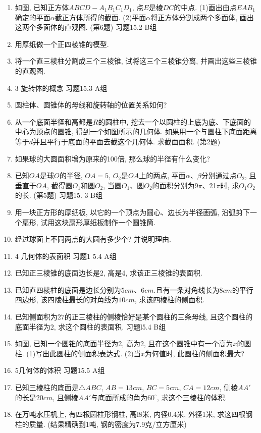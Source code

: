 \documentclass[10pt,a4paper]{article}
\begin{document}
\begin{enumerate}[1.]
(第5题)
\item 如图, 已知正方体$ABCD-A_1B_1C_1D_1$, 点$E$是棱$DC$的中点.
(1)画出由点$EAB_1$确定的平面$\alpha$截正方体所得的截面.
(2)平面$\alpha$将正方体分割成两个多面体, 画出这两个多面体的直观图.
(第6题)
习题15.2 B组
\item 用厚纸做一个正四棱锥的模型.
\item 将一个直三棱柱分割成三个三棱锥, 试将这三个三棱锥分离, 并画出这些三棱锥的直观图.
\item 3  旋转体的概念
习题15.3   A组
\item 圆柱体、圆锥体的母线和旋转轴的位置关系如何?
\item 从一个底面半径和高都是$R$的圆柱中, 挖去一个以圆柱的上底为底、下底面的中心为顶点的圆锥, 得到一个如图所示的几何体. 如果用一个与圆柱下底面距离等于$d$并且平行于底面的平面去截这个几何体. 求截面面积.
(第2题)
\item 如果球的大圆面积增为原来的100倍, 那么球的半径有什么变化?
\item 已知$OA$是球$O$的半径, $OA=5$, $O_2$是$OA$上的两点, 平面$\alpha$、$\beta$分别通过点$O_2$, 且垂直于$OA$, 截得圆$O_1$和圆$O_2$, 当圆$O_1$、圆$O_2$的面积分别为9$\pi$、21$\pi$时, 求$O_1O_2$的长.
(第5题)
习题15. 3   B组
\item 用一块正方形的厚纸板, 以它的一个顶点为圆心、边长为半径画弧, 沿弧剪下一个扇形, 试用这块扇形厚纸板制作一个圆锥筒.
\item 经过球面上不同两点的大圆有多少个? 并说明理由.
\item 4  几何体的表面积
习题1 5.4 A组
\item 已知正三棱锥的底面边长是2, 高是4, 求该正三棱锥的表面积.
\item 已知直四棱柱的底面是边长分别为$5cm$、$6cm$.且有一条对角线长为$8cm$的平行四边形, 该四陵柱最长的对角线为$10cm$, 求该四棱柱的侧面积.
\item 已知侧面积为27的正三棱柱的侧棱恰好是某个圆柱的三条母线, 且这个圆柱的底面半径为2, 求这个圆柱的表面积.
习题l5.4   B组
\item 如图, 已知一个圆锥的底面半径为2, 高为2, 且在这个圆锥中有一个高为$x$的圆柱.
(1)写出此圆柱的侧面积表达式.
(2)当$x$为何值时, 此圆柱的侧面积最大?
\item 5几何体的体积
习题15.5 A组
\item 已知三棱柱的底面是$\triangle ABC$, $AB=13cm$, $BC=5cm$, $CA=12cm$, 侧棱$AA'$的长是$20cm$, 且侧棱$AA'$与底面所成的角为$60^\circ$, 求这个三棱柱的体积.
\item 在万吨水压机上, 有四根圆柱形钢柱, 高l8米, 内径0.4米, 外径1米, 求这四根钢柱的质量. (结果精确到1吨, 钢的密度为7.9克/立方厘米)

\end{enumerate}
\end{document}

